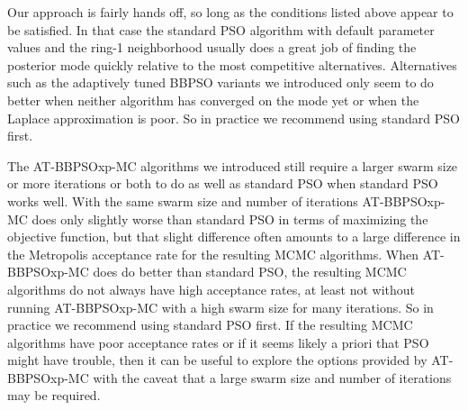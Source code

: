 \documentclass[12pt]{article}
\begin{document}
Our approach is fairly hands off, so long as the conditions listed above appear to be satisfied. In that case the standard PSO algorithm with default parameter values and the ring-1 neighborhood usually does a great job of finding the posterior mode quickly relative to the most competitive alternatives. Alternatives such as the adaptively tuned BBPSO variants we introduced only seem to do better when neither algorithm has converged on the mode yet or when the Laplace approximation is poor. So in practice we recommend using standard PSO first.


 The AT-BBPSOxp-MC algorithms we introduced still require a larger swarm size or more iterations or both to do as well as standard PSO when standard PSO works well. With the same swarm size and number of iterations AT-BBPSOxp-MC does only slightly worse than standard PSO in terms of maximizing the objective function, but that slight difference often amounts to a large difference in the Metropolis acceptance rate for the resulting MCMC algorithms. When AT-BBPSOxp-MC does do better than standard PSO, the resulting MCMC algorithms do not always have high acceptance rates, at least not without running AT-BBPSOxp-MC with a high swarm size for many iterations. So in practice we recommend using standard PSO first. If the resulting MCMC algorithms have poor acceptance rates or if it seems likely a priori that PSO might have trouble, then it can be useful to explore the options provided by AT-BBPSOxp-MC with the caveat that a large swarm size and number of iterations may be required.
 
\clearpage\pagebreak\newpage\thispagestyle{empty}


\end{document}
